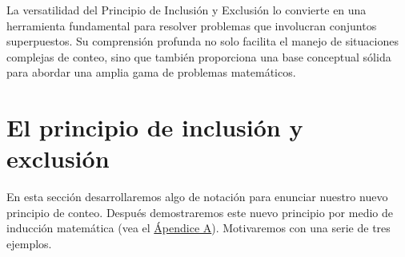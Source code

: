 La versatilidad del Principio de Inclusión y Exclusión lo convierte en una herramienta fundamental para resolver problemas que involucran conjuntos superpuestos. Su comprensión profunda no solo facilita el manejo de situaciones complejas de conteo, sino que también proporciona una base conceptual sólida para abordar una amplia gama de problemas matemáticos. 

\section{El principio de inclusión y exclusión}

En esta sección desarrollaremos algo de notación para enunciar nuestro nuevo principio de conteo. Después demostraremos este nuevo principio por medio de inducción matemática (vea el \hyperref[ch:induccion]{Ápendice A}). Motivaremos con una serie de tres ejemplos.%

